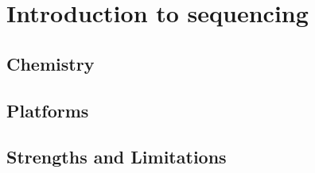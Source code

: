  

\chapter[Sequencing]{Introduction to sequencing}


\section*{Chemistry}

\section*{Platforms}

\section*{Strengths and Limitations}

